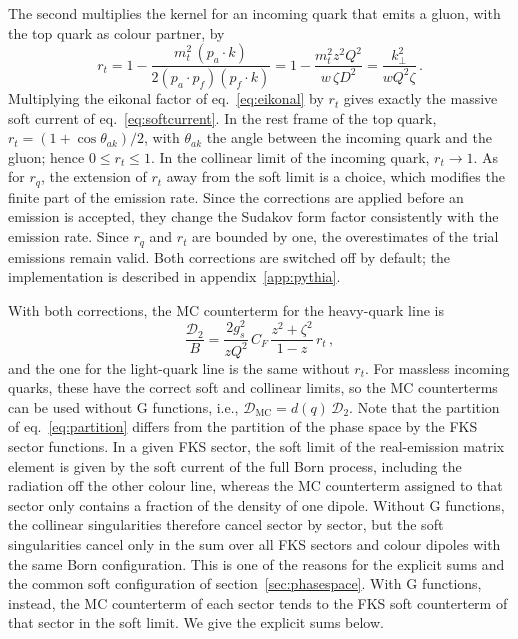 \documentclass[a4paper,11pt]{article}
\newcommand{\kt}{k_\perp}
\newcommand{\Dens}{\mathcal{D}}
\begin{document}
The second multiplies the kernel for an incoming quark that emits a
gluon, with the top quark as colour partner, by
\begin{equation}
  r_t=1-\frac{m_t^2\,(p_a\cdot k)}{2(p_a\cdot p_f)(p_f\cdot k)}
     =1-\frac{m_t^2z^2Q^2}{w\,\zeta D^2}
     =\frac{\kt^2}{wQ^2\zeta}\,.
  \label{eq:rt}
\end{equation}
Multiplying the eikonal factor of eq.~\eqref{eq:eikonal} by $r_t$ gives
exactly the massive soft current of eq.~\eqref{eq:softcurrent}. In the
rest frame of the top quark, $r_t=(1+\cos\theta_{ak})/2$, with
$\theta_{ak}$ the angle between the incoming quark and the gluon; hence
$0\le r_t\le1$. In the collinear limit of the incoming quark, $r_t\to1$.
As for $r_q$, the extension of $r_t$ away from the soft limit is a
choice, which modifies the finite part of the emission rate. Since the
corrections are applied before an emission is accepted, they
change the Sudakov form factor consistently with the emission rate.
Since $r_q$ and $r_t$ are bounded by one, the overestimates of the
trial emissions remain valid. Both corrections are switched off by
default; the implementation is described in appendix~\ref{app:pythia}.

With both corrections, the MC counterterm for the heavy-quark line is
\begin{equation}
  \frac{\Dens_2}{B}=\frac{2g_s^2}{zQ^2}\,C_F\,\frac{z^2+\zeta^2}{1-z}\,r_t\,,
  \label{eq:D2}
\end{equation}
and the one for the light-quark line is the same without $r_t$. For
massless incoming quarks, these have the correct soft and collinear
limits, so the MC counterterms can be used without G functions, i.e.,
$\Dens_{\mathrm{MC}}=d(q)\,\Dens_2$. Note that the partition of
eq.~\eqref{eq:partition} differs from the partition of the phase space
by the FKS sector functions. In a given FKS sector, the soft limit of
the real-emission matrix element is given by the soft current of the
full Born process, including the radiation off the other colour line,
whereas the MC counterterm assigned to that sector only contains a
fraction of the density of one dipole. Without G functions, the
collinear singularities therefore cancel sector by sector, but the soft
singularities cancel only in the sum over all FKS sectors and colour
dipoles with the same Born configuration. This is one of the reasons
for the explicit sums and the common soft configuration of
section~\ref{sec:phasespace}. With G functions, instead, the MC
counterterm of each sector tends to the FKS soft counterterm of that
sector in the soft limit. We give the explicit sums below.
\end{document}
